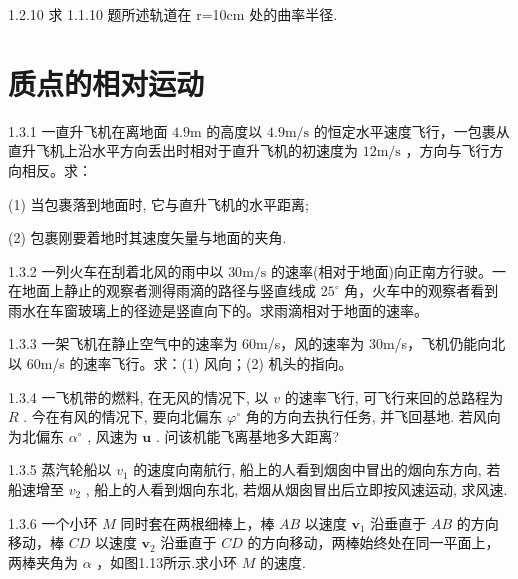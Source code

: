 \begin{problem}{1.2.10}
求 1.1.10 题所述轨道在 r=10cm 处的曲率半径.
\end{problem}
\clearpage


\section{质点的相对运动}

\begin{problem}{1.3.1}
一直升飞机在离地面 $4.9\mathrm{m}$ 的高度以 $4.9\mathrm{m / s}$ 的恒定水平速度飞行，一包裹从直升飞机上沿水平方向丢出时相对于直升飞机的初速度为 $12\mathrm{m / s}$ ，方向与飞行方向相反。求：

(1) 当包裹落到地面时, 它与直升飞机的水平距离;

(2) 包裹刚要着地时其速度矢量与地面的夹角.
\end{problem}
\clearpage


\begin{problem}{1.3.2}
一列火车在刮着北风的雨中以 $30\mathrm{m / s}$ 的速率(相对于地面)向正南方行驶。一在地面上静止的观察者测得雨滴的路径与竖直线成 $25^{\circ}$ 角，火车中的观察者看到雨水在车窗玻璃上的径迹是竖直向下的。求雨滴相对于地面的速率。
\end{problem}
\clearpage


\begin{problem}{1.3.3}
一架飞机在静止空气中的速率为 60m/s，风的速率为 30m/s，飞机仍能向北以 60m/s 的速率飞行。求：(1) 风向；(2) 机头的指向。
\end{problem}
\clearpage


\begin{problem}{1.3.4}
一飞机带的燃料, 在无风的情况下, 以 $v$ 的速率飞行, 可飞行来回的总路程为 $R$ . 今在有风的情况下, 要向北偏东 $\varphi^{\circ}$ 角的方向去执行任务, 并飞回基地. 若风向为北偏东 $\alpha^{\circ}$ , 风速为 $\bm{u}$ . 问该机能飞离基地多大距离?
\end{problem}
\clearpage


\begin{problem}{1.3.5}
蒸汽轮船以 $v_{1}$ 的速度向南航行, 船上的人看到烟囱中冒出的烟向东方向, 若船速增至 $v_{2}$ , 船上的人看到烟向东北, 若烟从烟囱冒出后立即按风速运动, 求风速.
\end{problem}
\clearpage


\begin{problem}{1.3.6}
一个小环 $M$ 同时套在两根细棒上，棒 $AB$ 以速度 $\bm{v}_{1}$ 沿垂直于 $AB$ 的方向移动，棒 $CD$ 以速度 $\bm{v}_{2}$ 沿垂直于 $CD$ 的方向移动，两棒始终处在同一平面上，两棒夹角为 $\alpha$ ，如图1.13所示.求小环 $M$ 的速度.
\begin{center}

\end{center}
\end{problem}
\clearpage



